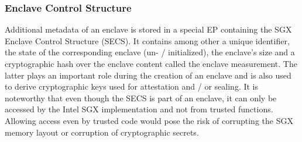 \subsubsection{Enclave Control Structure}
Additional metadata of an enclave is stored in a special EP containing the SGX Enclave Control Structure (SECS). It contains among other a unique identifier, the
state of the corresponding enclave (un- / initialized), the enclave's size and a cryptographic hash over the enclave content called the enclave measurement. The latter
plays an important role during the creation of an enclave and is also used to derive cryptographic keys used for attestation and / or sealing. It is noteworthy that even
though the SECS is part of an enclave, it can only be accessed by the Intel SGX implementation and not from trusted functions. Allowing access even by trusted code would
pose the risk of corrupting the SGX memory layout or corruption of cryptographic secrets.
